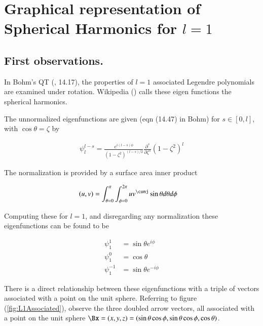 %

\chapter{Graphical representation of Spherical Harmonics for $l=1$}
\label{chap:L1Associated}
{}
\date{Aug 16, 2009}

\beginArtNoToc

\section{First observations.}

In Bohm's QT (\citep{bohm1989qt}, 14.17), the properties of $l=1$ associated Legendre polynomials are examined under rotation.  Wikipedia (\citep{wiki:sphericalHarm}) calls these eigen functions the spherical harmonics.

The unnormalized eigenfunctions are given (eqn (14.47) in Bohm) for $s \in [0,l]$, with $\cos\theta = \zeta$ by

\begin{align}\label{eqn:L1Associated:foo0}
\psi_l^{l-s} = \frac{e^{i(l-s)\phi}}{(1-\zeta^2)^{(l-s)/2}} \frac{\partial^s}{\partial \zeta^s} (1-\zeta^2)^l
\end{align}

The normalization is provided by a surface area inner product

\begin{align}\label{eqn:L1Associated:foo2}
(u,v) &= \int_{\theta=0}^{\pi} \int_{\phi=0}^{2\pi} u v^\conj \sin\theta d\theta d\phi
\end{align}

Computing these for $l=1$, and disregarding any normalization these eigenfunctions can be found to be

\begin{align}\label{eqn:L1Associated:foo1}
\psi_1^1 &= \sin\theta e^{i\phi} \\
\psi_1^0 &= \cos\theta \\
\psi_1^{-1} &= \sin\theta e^{-i\phi}
\end{align}

There is a direct relationship between these eigenfunctions with a triple of vectors associated with a point on the unit sphere.  Referring to figure (\ref{fig:L1Associated}), observe the three doubled arrow vectors, all associated with a point on the unit sphere $\Bx = (x,y,z) = (\sin\theta \cos\phi, \sin\theta \cos\phi, \cos\theta)$.  

